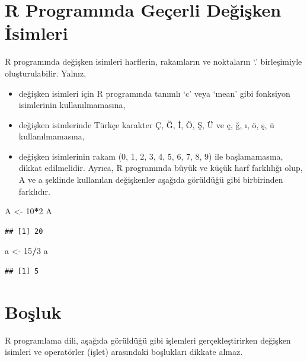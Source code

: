 \documentclass[
]{book}
\newenvironment{Shaded}{\begin{snugshade}}{\end{snugshade}}
\newcommand{\DecValTok}[1]{\textcolor[rgb]{0.00,0.00,0.81}{#1}}
\newcommand{\NormalTok}[1]{#1}
\newcommand{\OtherTok}[1]{\textcolor[rgb]{0.56,0.35,0.01}{#1}}
\newcommand{\SpecialCharTok}[1]{\textcolor[rgb]{0.81,0.36,0.00}{\textbf{#1}}}
\providecommand{\tightlist}{%
  \setlength{\itemsep}{0pt}\setlength{\parskip}{0pt}}
\begin{document}
\section{R Programında Geçerli Değişken İsimleri}\label{r-programux131nda-geuxe7erli-deux11fiux15fken-isimleri}

R programında değişken isimleri harflerin, rakamların ve noktaların `.' birleşimiyle oluşturulabilir. Yalnız,

\begin{itemize}
\tightlist
\item
  değişken isimleri için R programında tanımlı `c' veya `mean' gibi fonksiyon isimlerinin kullanılmamasına,
\item
  değişken isimlerinde Türkçe karakter Ç, Ğ, İ, Ö, Ş, Ü ve ç, ğ, ı, ö, ş, ü kullanılmamasına,
\item
  değişken isimlerinin rakam (0, 1, 2, 3, 4, 5, 6, 7, 8, 9) ile başlamamasına,
  dikkat edilmelidir. Ayrıca, R programında büyük ve küçük harf farklılığı olup, A ve a şeklinde kullanılan değişkenler aşağıda görüldüğü gibi birbirinden farklıdır.
\end{itemize}

\begin{Shaded}
\begin{Highlighting}[]
\NormalTok{A }\OtherTok{\textless{}{-}} \DecValTok{10}\SpecialCharTok{*}\DecValTok{2} 
\NormalTok{A}
\end{Highlighting}
\end{Shaded}

\begin{verbatim}
## [1] 20
\end{verbatim}

\begin{Shaded}
\begin{Highlighting}[]
\NormalTok{a }\OtherTok{\textless{}{-}} \DecValTok{15}\SpecialCharTok{/}\DecValTok{3} 
\NormalTok{a }
\end{Highlighting}
\end{Shaded}

\begin{verbatim}
## [1] 5
\end{verbatim}

\section{Boşluk}\label{boux15fluk}

R programlama dili, aşağıda görüldüğü gibi işlemleri gerçekleştirirken değişken isimleri ve operatörler (işlet) arasındaki boşlukları dikkate almaz.
\end{document}
